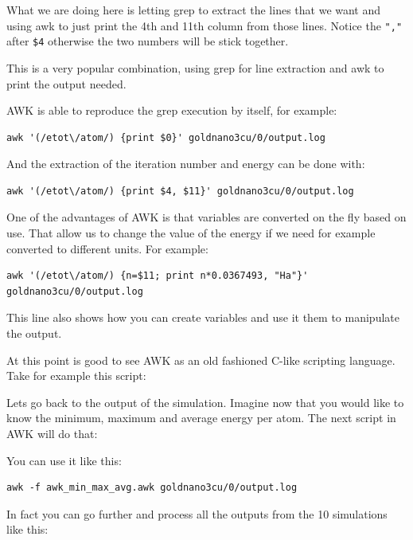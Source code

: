 What we are doing here is letting grep to extract the lines that we want and using awk to just print the 4th and 11th column from those lines. Notice the \verb|","| after \verb|$4| otherwise the two numbers will be stick together.

This is a very popular combination, using grep for line extraction and awk to print the output needed.

AWK is able to reproduce the grep execution by itself, for example:

\begin{lstlisting}
awk '(/etot\/atom/) {print $0}' goldnano3cu/0/output.log 
\end{lstlisting}

And the extraction of the iteration number and energy can be done with:

\begin{lstlisting}
awk '(/etot\/atom/) {print $4, $11}' goldnano3cu/0/output.log 
\end{lstlisting}

One of the advantages of AWK is that variables are converted on the fly based on use. That allow us to change the value of the energy if we need for example converted to different units. For example:

\begin{lstlisting}
awk '(/etot\/atom/) {n=$11; print n*0.0367493, "Ha"}' goldnano3cu/0/output.log
\end{lstlisting}

This line also shows how you can create variables and use it them to manipulate the output.

At this point is good to see AWK as an old fashioned C-like scripting language. Take for example this script:



Lets go back to the output of the simulation. Imagine now that you would like to know the minimum, maximum and average energy per atom. The next script in AWK will do that:



You can use it like this:

\begin{lstlisting}
awk -f awk_min_max_avg.awk goldnano3cu/0/output.log
\end{lstlisting}

In fact you can go further and process all the outputs from the 10 simulations like this:

